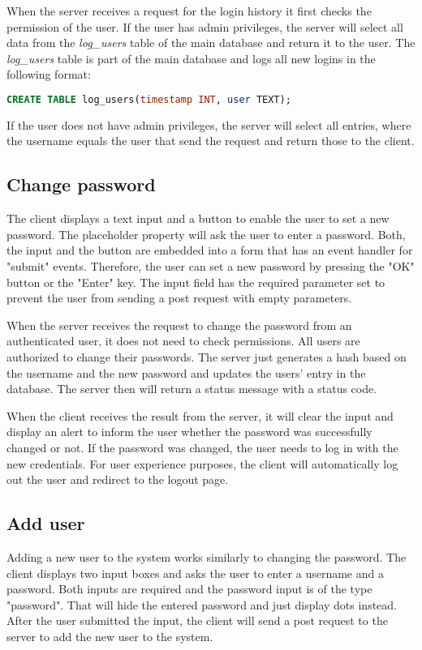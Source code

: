 When the server receives a request for the login history it first checks the permission of the user. If the user has admin privileges, the server will select all data from the \textit{log\_users} table of the main database and return it to the user.  The \textit{log\_users} table is part of the main database and logs all new logins in the following format:

\begin{lstlisting}[label = lst:log_users, language = SQL, numbers = none]
 CREATE TABLE log_users(timestamp INT, user TEXT);
\end{lstlisting}

If the user does not have admin privileges, the server will select all entries, where the username equals the user that send the request and return those to the client.


\subsection{Change password}
\label{subsec:change_password}
The client displays a text input and a button to enable the user to set a new password. The placeholder property will ask the user to enter a password. Both, the input and the button are embedded into a form that has an event handler for "submit" events. Therefore, the user can set a new password by pressing the "OK" button or the "Enter" key.  The input field has the required parameter set to prevent the user from sending a post request with empty parameters.

When the server receives the request to change the password from an authenticated user, it does not need to check permissions. All users are authorized to change their passwords. The server just generates a hash based on the username and the new password and updates the users' entry in the database. The server then will return a status message with a status code.

When the client receives the result from the server, it will clear the input and display an alert to inform the user whether the password was successfully changed or not. If the password was changed, the user needs to log in with the new credentials. For user experience purposes, the client will automatically log out the user and redirect to the logout page.


\subsection{Add user}
\label{subsec:add_user}
Adding a new user to the system works similarly to changing the password. The client displays two input boxes and asks the user to enter a username and a password. Both inputs are required and the password input is of the type "password". That will hide the entered password and just display dots instead. After the user submitted the input, the client will send a post request to the server to add the new user to the system.

